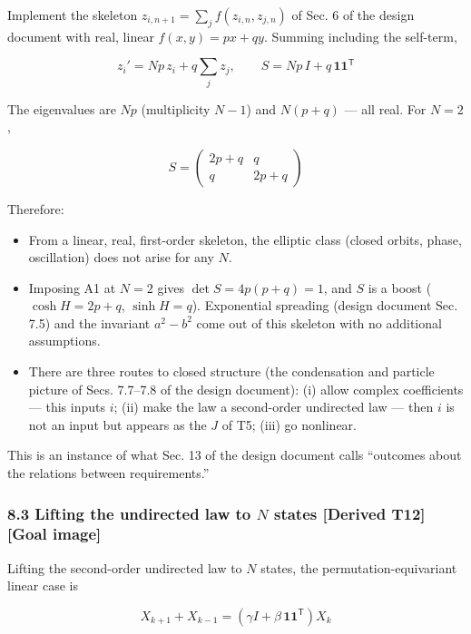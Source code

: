 \documentclass[
  a4paper,
]{article}
\providecommand{\tightlist}{%
  \setlength{\itemsep}{0pt}\setlength{\parskip}{0pt}}
\begin{document}
Implement the skeleton \(z_{i,n+1}=\sum_jf(z_{i,n},z_{j,n})\) of Sec. 6
of the design document with real, linear \(f(x,y)=px+qy\). Summing
including the self-term,

\[
z_i'=Np\,z_i+q\sum_jz_j,\qquad S=Np\,I+q\,\mathbf 1\mathbf 1^{\mathsf T}
\]

The eigenvalues are \(Np\) (multiplicity \(N-1\)) and \(N(p+q)\) --- all
real. For \(N=2\),

\[
S=\begin{pmatrix}2p+q&q\\q&2p+q\end{pmatrix}
\]

Therefore:

\begin{itemize}
\tightlist
\item
  From a linear, real, first-order skeleton, the elliptic class (closed
  orbits, phase, oscillation) does not arise for any \(N\).
\item
  Imposing A1 at \(N=2\) gives \(\det S=4p(p+q)=1\), and \(S\) is a
  boost (\(\cosh H=2p+q\), \(\sinh H=q\)). Exponential spreading (design
  document Sec. 7.5) and the invariant \(a^2-b^2\) come out of this
  skeleton with no additional assumptions.
\item
  There are three routes to closed structure (the condensation and
  particle picture of Secs. 7.7--7.8 of the design document): (i) allow
  complex coefficients --- this inputs \(i\); (ii) make the law a
  second-order undirected law --- then \(i\) is not an input but appears
  as the \(J\) of T5; (iii) go nonlinear.
\end{itemize}

This is an instance of what Sec. 13 of the design document calls
``outcomes about the relations between requirements.''

\subsubsection{\texorpdfstring{8.3 Lifting the undirected law to \(N\)
states {[}Derived T12{]} {[}Goal
image{]}}{8.3 Lifting the undirected law to N states {[}Derived T12{]} {[}Goal image{]}}}\label{lifting-the-undirected-law-to-n-states-derived-t12-goal-image}

Lifting the second-order undirected law to \(N\) states, the
permutation-equivariant linear case is

\[
X_{k+1}+X_{k-1}=(\gamma I+\beta\,\mathbf 1\mathbf 1^{\mathsf T})X_k
\]
\end{document}
